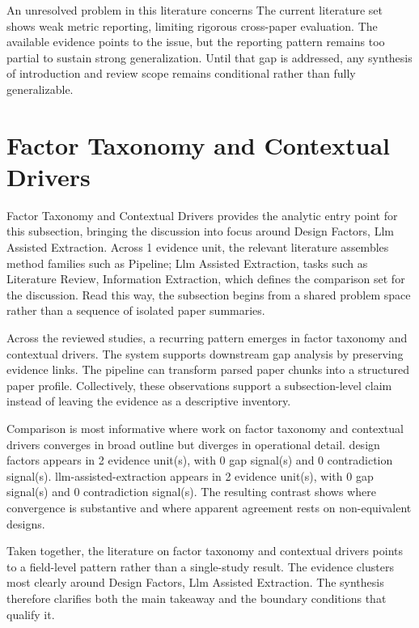 \documentclass{article}
\begin{document}
An unresolved problem in this literature concerns The current literature set shows weak metric reporting, limiting rigorous cross-paper evaluation. The available evidence points to the issue, but the reporting pattern remains too partial to sustain strong generalization. Until that gap is addressed, any synthesis of introduction and review scope remains conditional rather than fully generalizable. \cite{01_2001_hamed_safety_science}

\section{Factor Taxonomy and Contextual Drivers}
Factor Taxonomy and Contextual Drivers provides the analytic entry point for this subsection, bringing the discussion into focus around Design Factors, Llm Assisted Extraction. Across 1 evidence unit, the relevant literature assembles method families such as Pipeline; Llm Assisted Extraction, tasks such as Literature Review, Information Extraction, which defines the comparison set for the discussion. Read this way, the subsection begins from a shared problem space rather than a sequence of isolated paper summaries. \cite{01_2001_hamed_safety_science}

Across the reviewed studies, a recurring pattern emerges in factor taxonomy and contextual drivers. The system supports downstream gap analysis by preserving evidence links. The pipeline can transform parsed paper chunks into a structured paper profile. Collectively, these observations support a subsection-level claim instead of leaving the evidence as a descriptive inventory. \cite{01_2001_hamed_safety_science}

Comparison is most informative where work on factor taxonomy and contextual drivers converges in broad outline but diverges in operational detail. design factors appears in 2 evidence unit(s), with 0 gap signal(s) and 0 contradiction signal(s). llm-assisted-extraction appears in 2 evidence unit(s), with 0 gap signal(s) and 0 contradiction signal(s). The resulting contrast shows where convergence is substantive and where apparent agreement rests on non-equivalent designs. \cite{01_2001_hamed_safety_science}

Taken together, the literature on factor taxonomy and contextual drivers points to a field-level pattern rather than a single-study result. The evidence clusters most clearly around Design Factors, Llm Assisted Extraction. The synthesis therefore clarifies both the main takeaway and the boundary conditions that qualify it. \cite{01_2001_hamed_safety_science}
\end{document}
